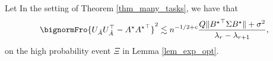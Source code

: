 \documentclass[aos,preprint]{imsart}
\begin{document}
		
	\begin{lemma}\label{claim_opt_dist}
		Let  In the setting of Theorem \ref{thm_many_tasks}, we have that %
		\[ \bignormFro{U_{\hat{A}} U_{\hat{A}}^{\top} - A^{\star} {A^{\star}}^{\top}}^2
				\lesssim  n^{-1/2+c}  \frac{ Q  \|{B^{\star}}^\top\Sigma B^{\star}\|  +  \sigma^2 }{\lambda_r - \lambda_{r+1} } ,\]
				on the high probability event $\Xi$ in Lemma \ref{lem_exp_opt}.
	\end{lemma}
	
\end{document}
